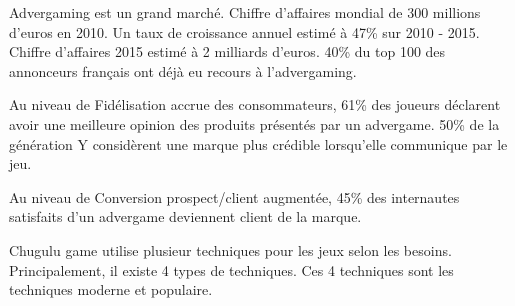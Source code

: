 Advergaming est un grand marché. Chiffre d’affaires mondial de 300 millions d’euros en 2010. Un taux de croissance annuel estimé à 47\% sur 2010 - 2015. Chiffre d’affaires 2015 estimé à 2 milliards d’euros. 40\% du top 100 des annonceurs français ont déjà eu recours à l’advergaming.

Au niveau de Fidélisation accrue des consommateurs, 61\% des joueurs déclarent avoir une meilleure opinion des produits présentés par un advergame. 50\% de la génération Y considèrent une marque plus crédible lorsqu'elle communique par le jeu.

Au niveau de Conversion prospect/client augmentée, 45\% des internautes satisfaits d’un advergame deviennent client de la marque.




Chugulu game utilise plusieur techniques pour les jeux selon les besoins. Principalement, il existe 4 types de techniques. Ces 4 techniques sont les techniques moderne et populaire. 

